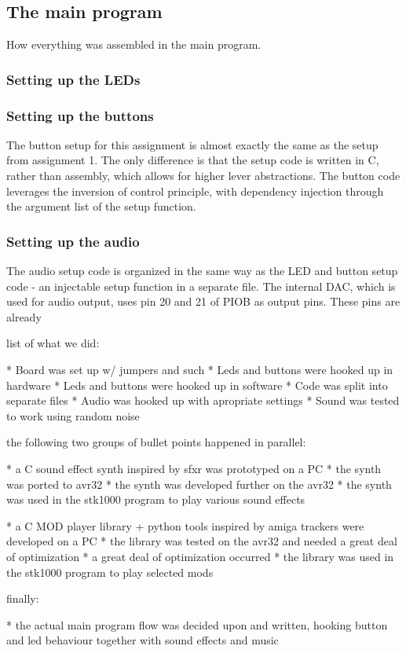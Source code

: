 \subsection{The main program}

How everything was assembled in the main program.

\subsubsection{Setting up the LEDs}
\subsubsection{Setting up the buttons}

The button setup for this assignment is almost exactly the same as the setup from assignment 1.\cite{tdt4258-1}
The only difference is that the setup code is written in C, rather than assembly, which allows for higher lever abstractions.
The button code leverages the inversion of control principle, with dependency injection through the argument list of the setup function.

\subsubsection{Setting up the audio}

The audio setup code is organized in the same way as the LED and button setup code - an injectable setup function in a separate file.
The internal DAC, which is used for audio output, uses pin 20 and 21 of PIOB as output pins.
These pins are already 


list of what we did:

* Board was set up w/ jumpers and such
* Leds and buttons were hooked up in hardware
* Leds and buttons were hooked up in software
* Code was split into separate files
* Audio was hooked up with apropriate settings
* Sound was tested to work using random noise


the following two groups of bullet points happened in parallel:

* a C sound effect synth inspired by sfxr was prototyped on a PC
* the synth was ported to avr32
* the synth was developed further on the avr32
* the synth was used in the stk1000 program to play various sound effects

* a C MOD player library + python tools inspired by amiga trackers were developed on a PC
* the library was tested on the avr32 and needed a great deal of optimization
* a great deal of optimization occurred 
* the library was used in the stk1000 program to play selected mods


finally:

* the actual main program flow was decided upon and written, hooking button and led behaviour together with sound effects and music
